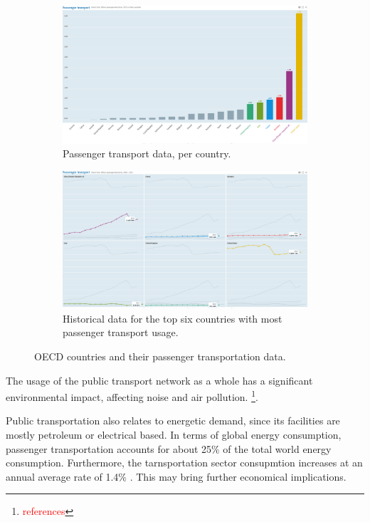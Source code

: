\documentclass{article}
\newcommand{\selfnote}[1]{\footnote{\textcolor{red}{#1}}}
\begin{document}
\begin{figure}[H]
  \centering
  \begin{subfigure}[b]{.8\textwidth}
  	\centering
  	\includegraphics[width=\linewidth]{./images/OECD_passengers_absolute.png}
  	\caption{Passenger transport data, per country.}
  \end{subfigure}
  \begin{subfigure}[b]{.8\textwidth}
  	\centering
  	\includegraphics[width=\linewidth]{./images/OECD_passengers_increase.png}
  	\caption{Historical data for the top six countries with most passenger transport usage.}
  \end{subfigure}
  \caption{OECD countries and their passenger transportation data.}
  	\label{fig:transportation/passenger}
\end{figure}

The usage of the public transport network as a whole has a significant environmental impact, affecting noise and air pollution. \selfnote{references}. 


Public transportation also relates to energetic demand, since its facilities are mostly petroleum or electrical based. In terms of global energy consumption, passenger transportation accounts for about 25\% of the total world energy consumption. Furthermore, the tarnsportation sector consupmtion increases at an annual average rate of 1.4\% \cite{eia2016energy}. This may bring further economical implications.
\end{document}
